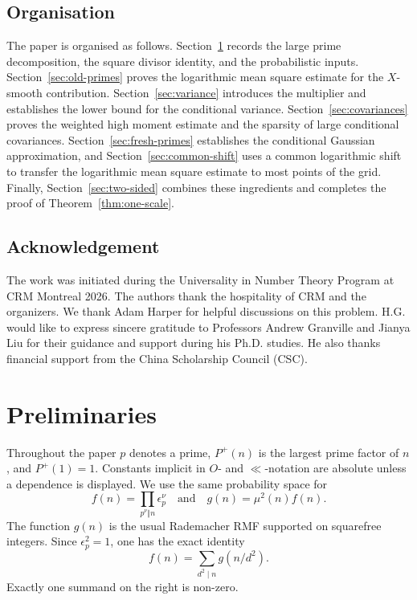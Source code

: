 \documentclass[a4paper,12pt,reqno]{amsart}
\numberwithin{equation}{section}
\theoremstyle{remark}
\begin{document}
\subsection{Organisation}The paper is organised as follows.
Section~\ref{sec:preliminaries} records the large prime decomposition,
the square divisor identity, and the probabilistic inputs.
Section~\ref{sec:old-primes} proves the logarithmic mean square estimate
for the \(X\)-smooth contribution.
Section~\ref{sec:variance} introduces the  multiplier and
establishes the lower bound for the conditional variance.
Section~\ref{sec:covariances} proves the weighted high moment estimate and
the sparsity of large conditional covariances.
Section~\ref{sec:fresh-primes} establishes the conditional Gaussian approximation, and Section~\ref{sec:common-shift} uses a common logarithmic shift to transfer the logarithmic mean square estimate to most points of the grid.
Finally, Section~\ref{sec:two-sided} combines these ingredients and
completes the proof of Theorem~\ref{thm:one-scale}.


\subsection*{Acknowledgement} The work was initiated during the Universality in Number Theory Program at CRM Montreal 2026. The authors thank the hospitality of CRM and the organizers. We thank Adam Harper for helpful discussions on this problem. 
H.G. would like to express sincere gratitude to Professors Andrew Granville and Jianya Liu for their guidance and support during his Ph.D. studies. He also thanks  financial support from the China Scholarship Council (CSC). 
 

\section{Preliminaries}\label{sec:preliminaries}

Throughout the paper $p$ denotes a prime, $P^+(n)$ is the largest prime
factor of $n$, and $P^+(1)=1$.  Constants implicit in $O$- and
$\ll$-notation are absolute unless a dependence is displayed.  We use the
same probability space for
\[
 f(n)=\prod_{p^\nu\Vert n}\epsilon_p^\nu
 \quad\text{and}\quad
 g(n)=\mu^2(n)f(n).
\]
The function $g(n)$ is the usual Rademacher RMF
supported on squarefree integers. Since $\epsilon_p^2=1$, one has the exact
identity
\begin{equation}\label{eq:square-convolution}
 f(n)=\sum_{d^2\mid n}g(n/d^2).
\end{equation}
Exactly one summand on the right is non-zero.
\end{document}
